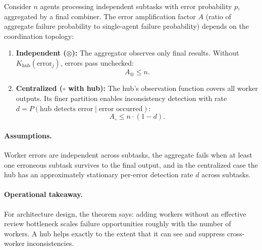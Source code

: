 \begin{theorem}
\label{thm:error-amplification}
Consider $n$ agents processing independent subtasks with error probability $p$, aggregated by a final combiner. The error amplification factor $A$ (ratio of aggregate failure probability to single-agent failure probability) depends on the coordination topology:
\begin{enumerate}[leftmargin=*]
\item[(a)] \textbf{Independent ($\otimes$):} The aggregator observes only final results. Without $K_{\mathrm{hub}}(\mathrm{error}_j)$, errors pass unchecked:
\begin{equation}
A_{\otimes} \le n.
\label{eq:error-amp-independent}
\end{equation}
\item[(b)] \textbf{Centralized ($\circ$ with hub):} The hub's observation function covers all worker outputs. Its finer partition enables inconsistency detection with rate $d = P(\text{hub detects error} \mid \text{error occurred})$:
\begin{equation}
A_{\circ} \le n \cdot (1 - d).
\label{eq:error-amp-centralized}
\end{equation}
\end{enumerate}
\end{theorem}

\paragraph{Assumptions.}
Worker errors are independent across subtasks, the aggregate fails when at least one erroneous subtask survives to the final output, and in the centralized case the hub has an approximately stationary per-error detection rate $d$ across subtasks.

\paragraph{Operational takeaway.}
For architecture design, the theorem says: adding workers without an effective review bottleneck scales failure opportunities roughly with the number of workers. A hub helps exactly to the extent that it can see and suppress cross-worker inconsistencies.

